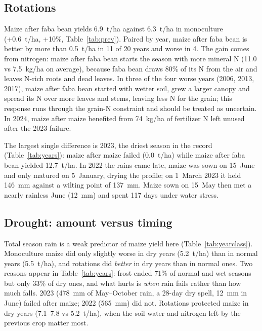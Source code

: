 \documentclass[11pt,a4paper]{article}
\begin{document}
\subsection{Rotations}


Maize after faba bean yields 6.9~t/ha against 6.3~t/ha in monoculture (+0.6~t/ha, +10\%, Table~\ref{tab:prev}).
Paired by year, maize after faba bean is better by more than 0.5~t/ha in 11 of 20 years and worse in 4. The gain
comes from nitrogen: maize after faba bean starts the season with more mineral N (11.0 vs 7.5~kg/ha on average),
because faba bean draws 80\% of its N from the air and leaves N-rich roots and dead leaves. In three of the four worse
years (2006, 2013, 2017), maize after faba bean started with wetter soil, grew a larger canopy and spread its N over
more leaves and stems, leaving less N for the grain; this response runs through the grain-N constraint and should be
treated as uncertain. In 2024, maize after maize benefited from 74~kg/ha of fertilizer N left unused after the
2023 failure.

The largest single difference is 2023, the driest season in the record (Table~\ref{tab:years}): maize after maize
failed (0.0~t/ha) while maize after faba bean yielded 12.7~t/ha. In 2022 the rains came late, maize was sown on
15~June and only matured on 5~January, drying the profile; on 1~March 2023 it held 146~mm against a wilting point
of 137~mm. Maize sown on 15~May then met a nearly rainless June (12~mm) and spent 117 days under water stress.

\subsection{Drought: amount versus timing}



Total season rain is a weak predictor of maize yield here (Table~\ref{tab:yearclass}). Monoculture maize did only
slightly worse in dry years (5.2~t/ha) than in normal years (5.5~t/ha), and rotations did \emph{better} in dry years
than in normal ones. Two reasons appear in Table~\ref{tab:years}: frost ended 71\% of normal and wet seasons but only
33\% of dry ones, and what hurts is \emph{when} rain fails rather than how much falls. 2023 (478~mm of May--October rain, a
28-day dry spell, 12~mm in June) failed after maize; 2022 (565~mm) did not. Rotations protected maize in dry years (7.1--7.8 vs
5.2~t/ha), when the soil water and nitrogen left by the previous crop matter most.
\end{document}
